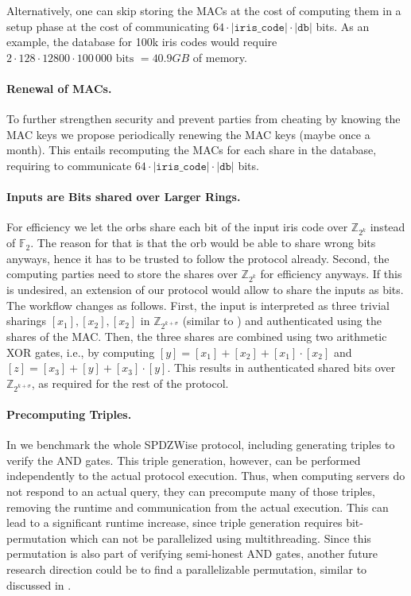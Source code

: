 \documentclass[a4paper,11pt,
]{article}
\newcommand{\F}{\ensuremath{\mathbb{F}}\xspace}
\newcommand{\Z}{\ensuremath{\mathbb{Z}}\xspace}
\newcommand{\shared}[1]{\ensuremath{[{#1}]}}
\begin{document}
Alternatively, one can skip storing the MACs at the cost of computing them in a setup phase at the cost of communicating $64 \cdot |\texttt{iris\_code}| \cdot |\texttt{db}|$ bits.
As an example, the database for 100k iris codes would require $2 \cdot 128 \cdot 12800 \cdot 100\,000 \text{ bits } = 40.9 GB$ of memory.

\paragraph{Renewal of MACs.}
To further strengthen security and prevent parties from cheating by knowing the MAC keys we propose periodically renewing the MAC keys (maybe once a month). This entails recomputing the MACs for each share in the database, requiring to communicate $64 \cdot |\texttt{iris\_code}| \cdot |\texttt{db}|$ bits.

\paragraph{Inputs are Bits shared over Larger Rings.}
For efficiency we let the orbs share each bit of the input iris code over $\Z_{2^k}$ instead of $\F_2$. The reason for that is that the orb would be able to share wrong bits anyways, hence it has to be trusted to follow the protocol already. Second, the computing parties need to store the shares over $\Z_{2^k}$ for efficiency anyways.
If this is undesired, an extension of our protocol would allow to share the inputs as bits. The workflow changes as follows. First, the input is interpreted as three trivial sharings $\shared{x_1}, \shared{x_2}, \shared{x_2}$ in $\Z_{2^{k + \sigma}}$ (similar to ) and authenticated using the shares of the MAC. Then, the three shares are combined using two arithmetic XOR gates, i.e., by computing $\shared{y} = \shared{x_1}+ \shared{x_2} + \shared{x_1} \cdot \shared{x_2}$ and $\shared{z} = \shared{x_3} + \shared{y} + \shared{x_3} \cdot \shared{y}$. This results in authenticated shared bits over $\Z_{2^{k + \sigma}}$, as required for the rest of the protocol.

\paragraph{Precomputing Triples.}
In  we benchmark the whole SPDZWise protocol, including generating triples to verify the AND gates. This triple generation, however, can be performed independently to the actual protocol execution. Thus, when computing servers  do not respond to an actual query, they can precompute many of those triples, removing the runtime and communication from the actual execution. This can lead to a significant runtime increase, since triple generation requires bit-permutation which can not be parallelized using multithreading. Since this permutation is also part of verifying semi-honest AND gates, another future research direction could be to find a parallelizable permutation, similar to discussed in \cite{DBLP:conf/sp/ArakiBFLLNOWW17}.

\printbibliography
\end{document}
